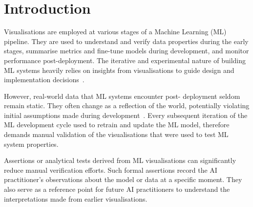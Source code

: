 \documentclass[sigconf]{acmart}
\begin{document}

\maketitle

\section{Introduction}

Visualisations are employed at various stages of a Machine Learning
(ML) pipeline. They are used to understand and verify data properties
during the early stages, summarise metrics and fine-tune models during
development, and monitor performance post-deployment. The iterative
and experimental nature of building ML systems heavily relies on
insights from visualisations to guide design and implementation
decisions~\cite{yuan2020survey,hohman2019visual,amershi2015modeltracker,wexler2019what-if,shome2022data,haakman2021ai}.

However, real-world data that ML systems encounter post- deployment
seldom remain static. They often change as a reflection of the world,
potentially violating initial assumptions made during
development~\cite{amershi2019software,lwakatare2021on}. Every
subsequent iteration of the ML development cycle used to retrain and
update the ML model, therefore demands manual validation of the
visualisations that were used to test ML system properties.

Assertions or analytical tests derived from ML visualisations can
significantly reduce manual verification efforts. Such formal
assertions record the AI practitioner's observations about the model
or data at a specific moment. They also serve as a reference point for
future AI practitioners to understand the interpretations made from
earlier visualisations.
\end{document}
